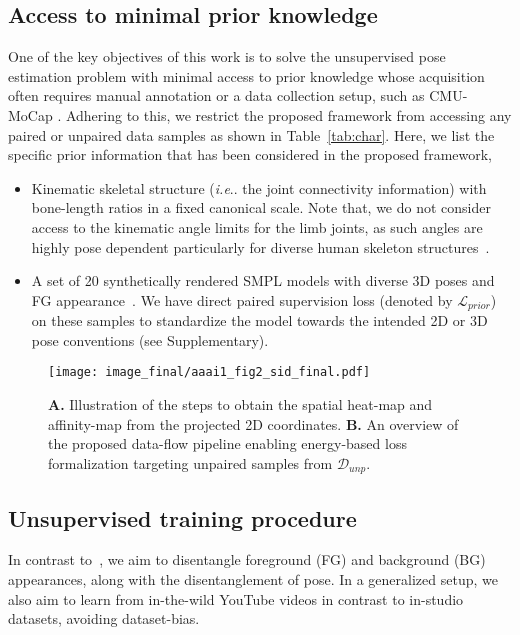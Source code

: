 \documentclass[letterpaper]{article} \usepackage{aaai20}  \usepackage{times}  \usepackage{helvet}  \usepackage{courier}  \usepackage{url}  \usepackage{graphicx}  \usepackage{amsmath}
\makeatletter
\DeclareRobustCommand\onedot{\futurelet\@let@token\@onedot}
\def\@onedot{\ifx\@let@token.\else.\null\fi\xspace}
\def\ie{\emph{i.e}\onedot} \def\Ie{\emph{I.e}\onedot}
\makeatother
\begin{document}
\subsection{Access to minimal prior knowledge}
One of the key objectives of this work is to solve the unsupervised pose estimation problem with minimal access to prior knowledge whose acquisition often requires manual annotation or a data collection setup, such as CMU-MoCap
. Adhering to this, we restrict the proposed framework from accessing any paired or unpaired data samples as shown in Table~\ref{tab:char}. Here, we list the specific prior information that has been considered in the proposed framework,
\begin{itemize}[leftmargin=0.35cm]
\item Kinematic skeletal structure (\ie the joint connectivity information) with bone-length ratios in a fixed canonical scale. Note that, {we do not consider access to the kinematic angle limits} for the limb joints, as such angles are highly pose dependent particularly for diverse human skeleton structures~\cite{akhter2015pose}.

\item A set of 20 synthetically rendered SMPL models with diverse 3D poses and FG appearance~\cite{varol2017learning}. We have direct paired supervision loss (denoted by $\mathcal{L}_{prior}$) on these samples to standardize the model towards the intended 2D or 3D pose conventions (see Supplementary).
\end{itemize}


\begin{figure*}\begin{center}
	\texttt{[image: image\_final/aaai1\_fig2\_sid\_final.pdf]}
	\caption{\textbf{A.} Illustration of the steps to obtain the spatial heat-map and affinity-map from the projected 2D coordinates. \textbf{B.} An overview of the proposed data-flow pipeline enabling energy-based loss formalization targeting unpaired samples from $\mathcal{D}_{unp}$.
	}
 	\label{fig:main2}    
    \vspace{-4mm}
\end{center}
\end{figure*}




\subsection{Unsupervised training procedure}
In contrast to~\cite{jakab2018unsupervised}, we aim to disentangle foreground (FG) and background (BG) appearances, along with the disentanglement of pose. In a generalized setup, we also aim to learn from in-the-wild YouTube videos in contrast to in-studio datasets, avoiding dataset-bias. 
\end{document}
